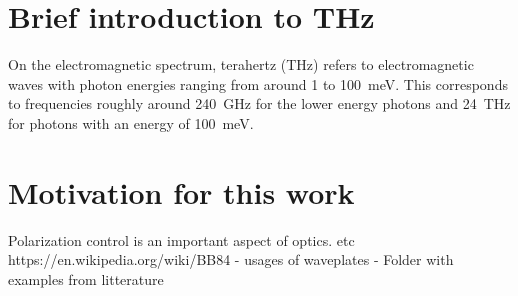 \section{Brief introduction to THz}
On the electromagnetic spectrum, terahertz (THz) refers to electromagnetic waves with photon energies ranging from around 1 to \SI{100}{\milli \electronvolt}. This corresponds to frequencies roughly around \SI{240}{\giga \hertz} for the lower energy photons and \SI{24}{\tera \hertz} for photons with an energy of \SI{100}{\milli \electronvolt}.


\section{Motivation for this work}
Polarization control is an important aspect of optics. etc https://en.wikipedia.org/wiki/BB84
- usages of waveplates
- Folder with examples from litterature
